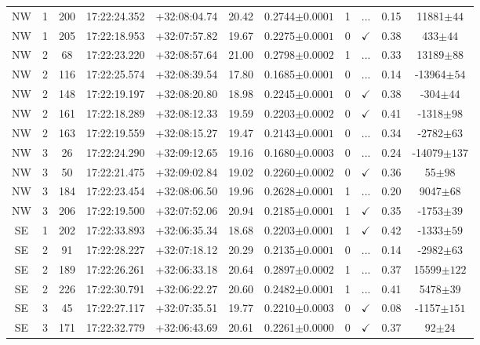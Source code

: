 \begin{table*}
\begin{tabular}{ccccccccccc}
NW & 1 & 200 & 17:22:24.352 & +32:08:04.74 & 20.42 & 0.2744$\pm{0.0001}$ & 1 & ... & 0.15 & 11881$\pm{44}$ \\
NW & 1 & 205 & 17:22:18.953 & +32:07:57.82 & 19.67 & 0.2275$\pm{0.0001}$ & 0 & $\checkmark$ & 0.38 & 433$\pm{44}$ \\
NW & 2 & 68 & 17:22:23.220 & +32:08:57.64 & 21.00 & 0.2798$\pm{0.0002}$ & 1 & ... & 0.33 & 13189$\pm{88}$ \\
NW & 2 & 116 & 17:22:25.574 & +32:08:39.54 & 17.80 & 0.1685$\pm{0.0001}$ & 0 & ... & 0.14 & -13964$\pm{54}$ \\
NW & 2 & 148 & 17:22:19.197 & +32:08:20.80 & 18.98 & 0.2245$\pm{0.0001}$ & 0 & $\checkmark$ & 0.38 & -304$\pm{44}$ \\
NW & 2 & 161 & 17:22:18.289 & +32:08:12.33 & 19.59 & 0.2203$\pm{0.0002}$ & 0 & $\checkmark$ & 0.41 & -1318$\pm{98}$ \\
NW & 2 & 163 & 17:22:19.559 & +32:08:15.27 & 19.47 & 0.2143$\pm{0.0001}$ & 0 & ... & 0.34 & -2782$\pm{63}$ \\
NW & 3 & 26 & 17:22:24.290 & +32:09:12.65 & 19.16 & 0.1680$\pm{0.0003}$ & 0 & ... & 0.24 & -14079$\pm{137}$ \\
NW & 3 & 50 & 17:22:21.475 & +32:09:02.84 & 19.02 & 0.2260$\pm{0.0002}$ & 0 & $\checkmark$ & 0.36 & 55$\pm{98}$ \\
NW & 3 & 184 & 17:22:23.454 & +32:08:06.50 & 19.96 & 0.2628$\pm{0.0001}$ & 1 & ... & 0.20 & 9047$\pm{68}$ \\
NW & 3 & 206 & 17:22:19.500 & +32:07:52.06 & 20.94 & 0.2185$\pm{0.0001}$ & 1 & $\checkmark$ & 0.35 & -1753$\pm{39}$ \\
SE & 1 & 202 & 17:22:33.893 & +32:06:35.34 & 18.68 & 0.2203$\pm{0.0001}$ & 1 & $\checkmark$ & 0.42 & -1333$\pm{59}$ \\
SE & 2 & 91 & 17:22:28.227 & +32:07:18.12 & 20.29 & 0.2135$\pm{0.0001}$ & 0 & ... & 0.14 & -2982$\pm{63}$ \\
SE & 2 & 189 & 17:22:26.261 & +32:06:33.18 & 20.64 & 0.2897$\pm{0.0002}$ & 1 & ... & 0.37 & 15599$\pm{122}$ \\
SE & 2 & 226 & 17:22:30.791 & +32:06:22.27 & 20.60 & 0.2482$\pm{0.0001}$ & 1 & ... & 0.41 & 5478$\pm{39}$ \\
SE & 3 & 45 & 17:22:27.117 & +32:07:35.51 & 19.77 & 0.2210$\pm{0.0003}$ & 0 & $\checkmark$ & 0.08 & -1157$\pm{151}$ \\
SE & 3 & 171 & 17:22:32.779 & +32:06:43.69 & 20.61 & 0.2261$\pm{0.0000}$ & 0 & $\checkmark$ & 0.37 & 92$\pm{24}$ \\

\end{tabular}
\end{table*}
